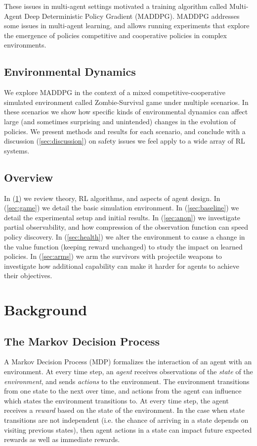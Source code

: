 \documentclass[11pt,a4paper]{article}
\begin{document}
These issues in multi-agent settings motivated a training algorithm called Multi-Agent Deep Deterministic Policy Gradient (MADDPG).
MADDPG addresses some issues in multi-agent learning, and allows running experiments that explore the emergence of policies competitive and cooperative policies in complex environments.

\subsection{Environmental Dynamics}

We explore MADDPG in the context of a mixed competitive-cooperative simulated environment called Zombie-Survival game under multiple scenarios.
In these scenarios we show how specific kinds of environmental dynamics can affect large (and sometimes surprising and unintended) changes in the evolution of policies.
We present methods and results for each scenario, and conclude with a discussion (\ref{sec:discussion}) on safety issues we feel apply to a wide array of RL systems.

\subsection{Overview}

In (\ref{sec:background}) we review theory, RL algorithms, and aspects of agent design.
In (\ref{sec:game}) we detail the basic simulation environment.
In (\ref{sec:baseline}) we detail the experimental setup and initial results.
In (\ref{sec:anon}) we investigate partial observability, and how compression of the observation function can speed policy discovery.
In (\ref{sec:health}) we alter the environment to cause a change in the value function (keeping reward unchanged) to study the impact on learned policies.
In (\ref{sec:arms}) we arm the survivors with projectile weapons to investigate how additional capability can make it harder for agents to achieve their objectives.

\section{Background}
\label{sec:background}

\subsection{The Markov Decision Process}

A Markov Decision Process (MDP) formalizes the interaction of an agent with an environment.
At every time step, an \emph{agent} receives observations of the \emph{state} of the \emph{environment}, and sends \emph{actions} to the environment.
The environment transitions from one state to the next over time, and actions from the agent can influence which states the environment transitions to.
At every time step, the agent receives a \emph{reward} based on the state of the environment.
In the case when state transitions are not independent (i.e. the chance of arriving in a state depends on visiting previous states), then agent actions in a state can impact future expected rewards as well as immediate rewards.
\end{document}
